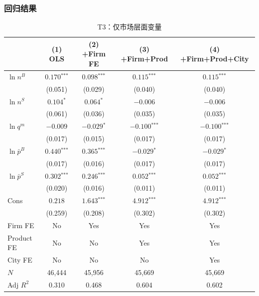 \documentclass[12pt]{article}
\newcommand{\sym}[1]{\ensuremath{^{\text{#1}}}}
\newcommand{\se}[1]{{\small(#1)}}
\begin{document}
\subsubsection*{回归结果}

\begin{table}[H]
  \centering
  \caption{T3：仅市场层面变量}
  \begin{threeparttable}
    \begin{tabular}{lcccc}
      \toprule
       & (1) OLS & (2) +Firm FE & (3) +Firm+Prod & (4) +Firm+Prod+City \\
      \midrule
      $\ln n^B$             & $0.170\sym{***}$ & $0.098\sym{***}$ & $0.115\sym{***}$ & $0.115\sym{***}$ \\
                            & \se{0.051}       & \se{0.029}       & \se{0.040}       & \se{0.040} \\[4pt]
      $\ln n^S$             & $0.104\sym{*}$  & $0.064\sym{*}$  & $-0.006$ & $-0.006$ \\
                            & \se{0.061}      & \se{0.036}      & \se{0.035} & \se{0.035} \\[4pt]
      $\ln q^m$             & $-0.009$ & $-0.029\sym{*}$ & $-0.100\sym{***}$ & $-0.100\sym{***}$ \\
                            & \se{0.017} & \se{0.015}      & \se{0.017}        & \se{0.017} \\[4pt]
      $\ln\bar{p}^{B}$      & $0.440\sym{***}$ & $0.365\sym{***}$ & $-0.029\sym{*}$ & $-0.029\sym{*}$ \\
                            & \se{0.017}       & \se{0.016}       & \se{0.017} & \se{0.017} \\[4pt]
      $\ln\bar{p}^{S}$      & $0.302\sym{***}$ & $0.246\sym{***}$ & $0.052\sym{***}$ & $0.052\sym{***}$ \\
                            & \se{0.020}       & \se{0.016}       & \se{0.011} & \se{0.011} \\[4pt]
      Cons                & $0.218$ & $1.643\sym{***}$ & $4.912\sym{***}$ & $4.912\sym{***}$ \\
                            & \se{0.259}     & \se{0.208}       & \se{0.302}       & \se{0.302}       \\
      \midrule
      Firm FE               & No  & Yes & Yes & Yes \\
      Product FE            & No  & No  & Yes & Yes \\
      City FE               & No  & No  & No  & Yes \\
      $N$                   & 46,444 & 45,956 & 45,669 & 45,669 \\
      Adj $R^2$             & 0.310  & 0.468  & 0.604  & 0.602  \\
      \bottomrule
    \end{tabular}
  \end{threeparttable}
\end{table}
\end{document}
